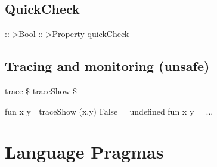 \documentclass{refcard}
\begin{document}
\subsection{QuickCheck \hfill {}}

\begin{ldesc}
		 ::\s{}\s{}->\s{}Bool \li
		 ::\s{}\s{}->\s{}Property
		quickCheck 
\end{ldesc}




%


\subsection{Tracing and monitoring (unsafe) \hfill {}}

\begin{ldesc}
	 trace  \$ 
	                traceShow  \$ 
\end{ldesc}
\begin{ldesc}
	  fun x y | traceShow (x,y) False = undefined 
	                     fun x y = ...
\end{ldesc}


\section{Language Pragmas}
\end{document}
